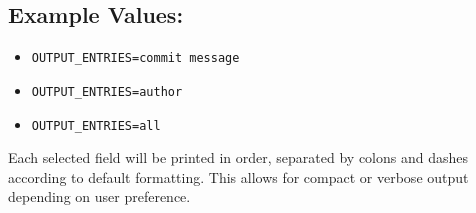 \subsection*{Example Values:}
\begin{itemize}
	\item \texttt{OUTPUT\_ENTRIES=commit message}
	\item \texttt{OUTPUT\_ENTRIES=author}
	\item \texttt{OUTPUT\_ENTRIES=all}
\end{itemize}

Each selected field will be printed in order, separated by colons and dashes according to default formatting. This allows for compact or verbose output depending on user preference.

